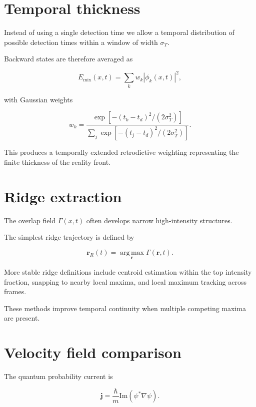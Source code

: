 \documentclass[aps,prl,reprint]{revtex4-2}
\begin{document}
\section{Temporal thickness}

Instead of using a single detection time we allow a temporal
distribution of possible detection times within a window of
width $\sigma_T$.

Backward states are therefore averaged as

\begin{equation}
E_{\mathrm{mix}}(x,t)
=
\sum_k
w_k
|\phi_k(x,t)|^2 ,
\end{equation}

with Gaussian weights

\begin{equation}
w_k =
\frac{
\exp[-(t_k-t_d)^2/(2\sigma_T^2)]
}{
\sum_j
\exp[-(t_j-t_d)^2/(2\sigma_T^2)]
}.
\end{equation}

This produces a temporally extended retrodictive weighting
representing the finite thickness of the reality front.



\section{Ridge extraction}

The overlap field $\Gamma(x,t)$ often develops narrow
high-intensity structures.

The simplest ridge trajectory is defined by

\begin{equation}
\mathbf r_R(t)
=
\operatorname*{arg\,max}_{\mathbf r}
\Gamma(\mathbf r,t).
\end{equation}

More stable ridge definitions include centroid estimation
within the top intensity fraction, snapping to nearby local
maxima, and local maximum tracking across frames.

These methods improve temporal continuity when multiple
competing maxima are present.



\section{Velocity field comparison}

The quantum probability current is

\begin{equation}
\mathbf j =
\frac{\hbar}{m}
\mathrm{Im}
(\psi^* \nabla \psi).
\end{equation}
\end{document}
